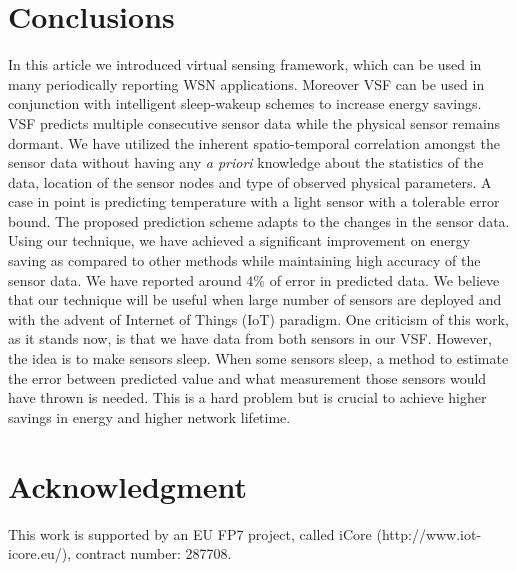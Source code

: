 \documentclass[a4paper,conference]{IEEEtran}
\begin{document}
\section{Conclusions}
\label{con}
In this article we introduced virtual sensing framework, which can be used in many periodically reporting WSN applications. Moreover VSF can be used in conjunction with intelligent sleep-wakeup schemes to increase energy savings. VSF predicts multiple consecutive sensor data while the physical sensor remains dormant. We have utilized the inherent spatio-temporal correlation amongst the sensor data without having any \textit{a priori} knowledge about the statistics of the data, location of the sensor nodes and type of observed physical parameters. A case in point is predicting temperature with a light sensor with a tolerable error bound. The proposed prediction scheme adapts to the changes in the sensor data. Using our technique, we have achieved a significant improvement on energy saving as compared to other methods while maintaining high accuracy of the sensor data. We have reported around 4\% of error in predicted data.  We believe that our technique will be useful when large number of sensors are deployed and with the advent of Internet of Things (IoT) paradigm. One criticism of this work, as it stands now, is that we have data from both sensors in our VSF. However, the idea is to make sensors sleep. When some sensors sleep, a method to estimate the error between predicted value and what measurement those sensors would have thrown is needed. This is a hard problem but is crucial to achieve higher savings in energy and higher network lifetime.



\section*{Acknowledgment}
This work is supported by an EU FP7 project, called iCore (http://www.iot-icore.eu/), contract number: 287708.




\tiny


\end{document}
